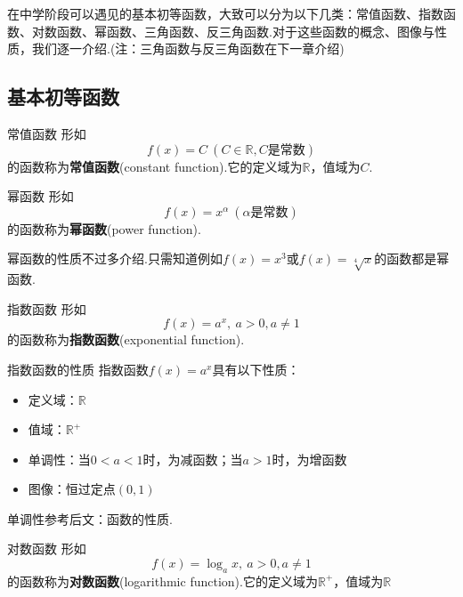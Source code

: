 \documentclass[lang=cn, zihao=5]{elegantbook}
\begin{document}
在中学阶段可以遇见的基本初等函数，大致可以分为以下几类：常值函数、指数函数、对数函数、幂函数、三角函数、反三角函数.对于这些函数的概念、图像与性质，我们逐一介绍.(注：三角函数与反三角函数在下一章介绍)

\subsection{基本初等函数}

\begin{definition}{常值函数}
    形如$$f(x)=C \ (C \in \mathbb{R}, C\textit{是常数})$$
    的函数称为\textbf{常值函数}(constant function).它的定义域为$\mathbb{R}$，值域为${C}$.
\end{definition}

\begin{definition}{幂函数}
    形如$$f(x)=x^{\alpha} \ (\alpha \text{是常数})$$
    的函数称为\textbf{幂函数}(power function).
\end{definition}

幂函数的性质不过多介绍.只需知道例如$f(x)=x^3$或$f(x)=\sqrt[4]{x}$的函数都是幂函数.

\begin{definition}{指数函数}
    形如$$f(x)=a^x, \ a>0 , a\neq 1$$
    的函数称为\textbf{指数函数}(exponential function).
\end{definition}

\begin{proposition}{指数函数的性质}
    指数函数$f(x)=a^x$具有以下性质：
    \begin{itemize}
        \item 定义域：$\mathbb{R}$
        \item 值域：$\mathbb{R}^+$
        \item 单调性：当$0<a<1$时，为减函数；当$a>1$时，为增函数
        \item 图像：恒过定点$(0,1)$
    \end{itemize}
\end{proposition}
\begin{remark}
    单调性参考后文：函数的性质.
\end{remark}


\begin{definition}{对数函数}
    形如$$f(x)=\log_{a}{x}, \ a>0,a \neq 1$$
    的函数称为\textbf{对数函数}(logarithmic function).它的定义域为$\mathbb{R}^{+}$，值域为$\mathbb{R}$
\end{definition}
\end{document}
